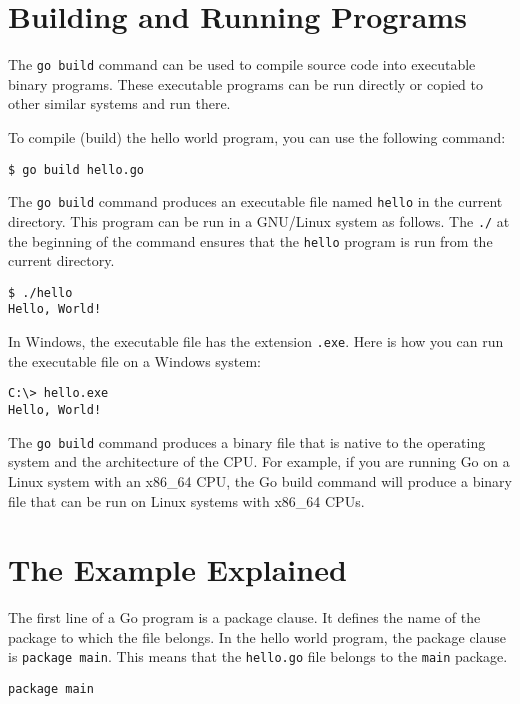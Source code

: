 \section{Building and Running Programs}

The \texttt{go build} command can be used to compile source code into executable
binary programs. These executable programs can be run directly or copied to
other similar systems and run there.

To compile (build) the hello world program, you can use the following command:

\begin{lstlisting}[numbers=none]
$ go build hello.go
\end{lstlisting}

The \texttt{go build} command produces an executable file named \texttt{hello}
in the current directory. This program can be run in a GNU/Linux system as
follows. The \texttt{./} at the beginning of the command ensures that
the \texttt{hello} program is run from the current directory.

\begin{lstlisting}[numbers=none]
$ ./hello
Hello, World!
\end{lstlisting}

In Windows, the executable file has the extension \texttt{.exe}. Here is how you
can run the executable file on a Windows system:

\begin{lstlisting}[numbers=none]
C:\> hello.exe
Hello, World!
\end{lstlisting}

The \texttt{go build} command produces a binary file that is native to the
operating system and the architecture of the CPU. For example, if you are
running Go on a Linux system with an x86\_64 CPU, the Go build command will
produce a binary file that can be run on Linux systems with x86\_64 CPUs.

\section{The Example Explained}

The first line of a Go program is a package clause. It defines the name of the
package to which the file belongs. In the hello world program, the package
clause is \texttt{package main}. This means that the \texttt{hello.go} file
belongs to the \texttt{main} package.

\begin{lstlisting}[numbers=none]
package main
\end{lstlisting}

